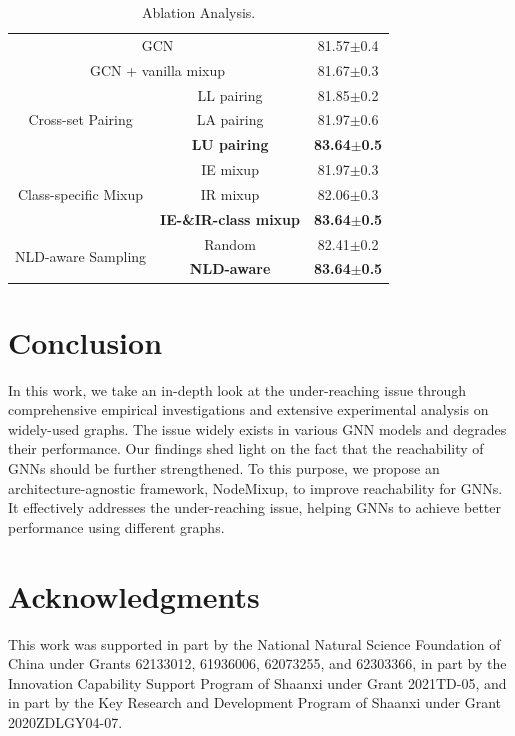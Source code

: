 \documentclass[letterpaper]{article} %
\begin{document}
\begin{table}[ht!]
    \centering
    \begin{tabular}{ c c c}
    \hline
    \toprule
    \multicolumn{2}{c}{GCN} & 81.57\small{$\pm$0.4} \\
	\multicolumn{2}{c}{GCN + vanilla mixup} & 81.67\small{$\pm$0.3} \\
	
	\midrule
	\midrule
	
\multirow{3}{*}{Cross-set Pairing} & LL pairing & 81.85\small{$\pm$0.2} \\
 ~ & LA pairing & 81.97\small{$\pm$0.6} \\
 ~ & \textbf{LU pairing} & \textbf{83.64\small{$\pm$0.5}} \\
 
 \midrule
 
 \multirow{3}{*}{Class-specific Mixup} & IE mixup & 81.97\small{$\pm$0.3} \\
 ~ & IR mixup & 82.06\small{$\pm$0.3} \\
 ~ & \textbf{IE-\&IR-class mixup} & \textbf{83.64\small{$\pm$0.5}} \\
 
 \midrule
 
 \multirow{2}{*}{NLD-aware Sampling} & Random & 82.41\small{$\pm$0.2} \\
 ~ & \textbf{NLD-aware} & \textbf{83.64\small{$\pm$0.5}} \\
	
    \bottomrule
    \hline
    \end{tabular}
    \caption{Ablation Analysis.}
    \label{tab:ablation}
\end{table}

\section{Conclusion}
In this work, we take an in-depth look at the under-reaching issue through comprehensive empirical investigations and extensive experimental analysis on widely-used graphs. The issue widely exists in various GNN models and degrades their performance. Our findings shed light on the fact that the reachability of GNNs should be further strengthened. To this purpose, we propose an architecture-agnostic framework, NodeMixup, to improve reachability for GNNs. It effectively addresses the under-reaching issue, helping GNNs to achieve better performance using different graphs. 


\section{Acknowledgments}
This work was supported in part by the National Natural Science Foundation of China under Grants 62133012, 61936006, 62073255, and 62303366, in part by the Innovation Capability Support Program of Shaanxi under Grant 2021TD-05, and in part by the Key Research and Development Program of Shaanxi under Grant 2020ZDLGY04-07.


\end{document}
